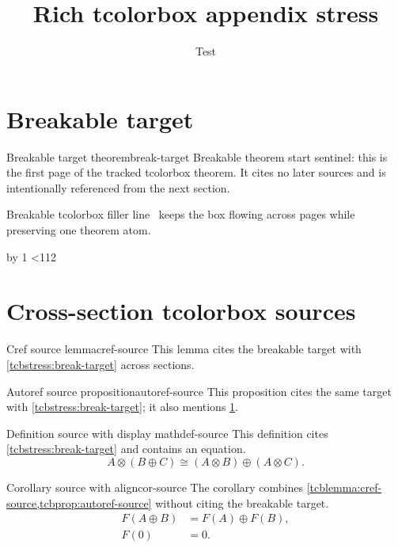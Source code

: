 \documentclass{article}
\title{Rich tcolorbox appendix stress}
\author{Test}
\date{}
\begin{document}
\START
\maketitle

\section{Breakable target}
\label{sec:tcb-app-target}

\begin{tcbstress}[breakable]{Breakable target theorem}{break-target}
Breakable theorem start sentinel: this is the first page of the tracked tcolorbox theorem.
It cites no later sources and is intentionally referenced from the next section.

\newcount\codeptcbline
{}
\loop
  Breakable tcolorbox filler line \the\codeptcbline\ keeps the box flowing across pages while preserving one theorem atom.\par
  \advance\codeptcbline by 1
\ifnum\codeptcbline<112
\repeat
\end{tcbstress}

\section{Cross-section tcolorbox sources}
\label{sec:tcb-app-sources}

\begin{tcblemma}{Cref source lemma}{cref-source}
This lemma cites the breakable target with \cref{tcbstress:break-target} across sections.
\end{tcblemma}

\begin{tcbprop}{Autoref source proposition}{autoref-source}
This proposition cites the same target with \autoref{tcbstress:break-target}; it also mentions \cref{sec:tcb-app-target}.
\end{tcbprop}

\begin{tcbdef}{Definition source with display math}{def-source}
This definition cites \cref{tcbstress:break-target} and contains an equation.
\begin{equation}\label{eq:tcb-app-balance}
  A \otimes (B \oplus C) \cong (A\otimes B) \oplus (A\otimes C).
\end{equation}
\end{tcbdef}

\begin{tcbcor}{Corollary source with align}{cor-source}
The corollary combines \cref{tcblemma:cref-source,tcbprop:autoref-source} without citing the breakable target.
\begin{align}
  F(A\oplus B) &= F(A)\oplus F(B),\\
  F(0) &= 0.
\end{align}
\end{tcbcor}
\end{document}
